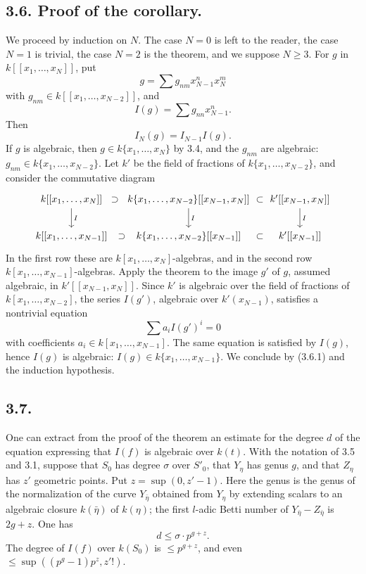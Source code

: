 \documentclass[11pt,leqno]{article}
\begin{document}
\subsection*{3.6. Proof of the corollary.}
We proceed by induction on $N$. The case $N=0$ is left to the reader, the case $N=1$ is trivial, the case $N=2$ is the theorem, and we suppose $N\ge3$. For $g$ in $k[[x_1,\ldots,x_N]]$, put
\[
        g=\sum g_{nm}x_{N-1}^n x_N^m
\]
with $g_{nm}\in k[[x_1,\ldots,x_{N-2}]]$, and
\[
        I(g)=\sum g_{nn}x_{N-1}^n.
\]
Then
\begin{equation}
        I_N(g)=I_{N-1}I(g). \tag{3.6.1}
\end{equation}
If $g$ is algebraic, then $g\in k\{x_1,\ldots,x_N\}$ by 3.4, and the $g_{nm}$ are algebraic: $g_{nm}\in k\{x_1,\ldots,x_{N-2}\}$. Let $k'$ be the field of fractions of $k\{x_1,\ldots,x_{N-2}\}$, and consider the commutative diagram
\[
\begin{tikzcd}[column sep=1.2em,row sep=2em]
k[[x_1,\ldots,x_N]] \arrow[r,phantom,"\supset"] \arrow[d,"I"] &
k\{x_1,\ldots,x_{N-2}\}[[x_{N-1},x_N]] \arrow[r,phantom,"\subset"] \arrow[d,"I"] &
k'[[x_{N-1},x_N]] \arrow[d,"I"] \\
k[[x_1,\ldots,x_{N-1}]] \arrow[r,phantom,"\supset"] &
k\{x_1,\ldots,x_{N-2}\}[[x_{N-1}]] \arrow[r,phantom,"\subset"] & k'[[x_{N-1}]]
\end{tikzcd}
\]
In the first row these are $k[x_1,\ldots,x_N]$-algebras, and in the second row $k[x_1,\ldots,x_{N-1}]$-algebras. Apply the theorem to the image $g'$ of $g$, assumed algebraic, in $k'[[x_{N-1},x_N]]$. Since $k'$ is algebraic over the field of fractions of
\clearpage
$k[x_1,\ldots,x_{N-2}]$, the series $I(g')$, algebraic over $k'(x_{N-1})$, satisfies a nontrivial equation
\[
        \sum a_iI(g')^i=0
\]
with coefficients $a_i\in k[x_1,\ldots,x_{N-1}]$. The same equation is satisfied by $I(g)$, hence $I(g)$ is algebraic: $I(g)\in k\{x_1,\ldots,x_{N-1}\}$. We conclude by (3.6.1) and the induction hypothesis.

\subsection*{3.7.}
One can extract from the proof of the theorem an estimate for the degree $d$ of the equation expressing that $I(f)$ is algebraic over $k(t)$. With the notation of 3.5 and 3.1, suppose that $S_0$ has degree $\sigma$ over $S'_0$, that $Y_\eta$ has genus $g$, and that $Z_\eta$ has $z'$ geometric points. Put $z=\sup(0,z'-1)$. Here the genus is the genus of the normalization of the curve $Y_{\bar\eta}$ obtained from $Y_\eta$ by extending scalars to an algebraic closure $k(\bar\eta)$ of $k(\eta)$; the first $l$-adic Betti number of $Y_{\bar\eta}-Z_{\bar\eta}$ is $2g+z$. One has
\begin{equation}
        d\le\sigma\cdot p^{g+z}. \tag{3.7.1}
\end{equation}
The degree of $I(f)$ over $k(S_0)$ is $\le p^{g+z}$, and even $\le\sup((p^g-1)p^z,z'!)$.
\end{document}
